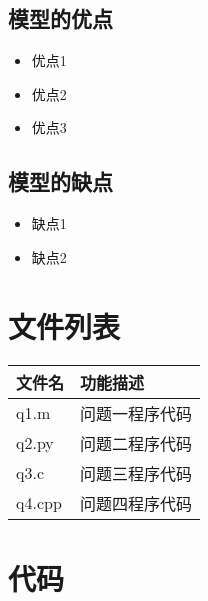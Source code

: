 \documentclass[withoutpreface,bwprint]{cumcmthesis}
\begin{document}
\subsection{模型的优点}
\begin{itemize}[itemindent=2em]
\item 优点1
\item 优点2
\item 优点3
\end{itemize}

\subsection{模型的缺点}
\begin{itemize}[itemindent=2em]
\item 缺点1
\item 缺点2
\end{itemize}

\nocite{*}

\newpage
\begin{appendices}
\section{文件列表}
\begin{table}[H]
\centering
\begin{tabularx}{\textwidth}{LL}
\toprule
文件名   & 功能描述 \\
\midrule
q1.m & 问题一程序代码 \\
q2.py & 问题二程序代码 \\
q3.c & 问题三程序代码 \\
q4.cpp & 问题四程序代码 \\
\bottomrule
\end{tabularx}
\label{tab:文件列表}
\end{table}

\section{代码}

\end{appendices}
\end{document}
